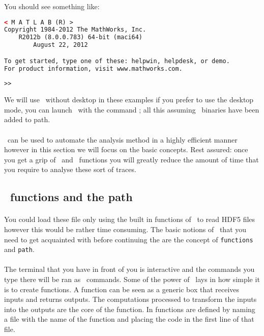 You should see something like:
\begin{lstlisting}[numbers=none,language=xml]
		< M A T L A B (R) >
Copyright 1984-2012 The MathWorks, Inc.
	R2012b (8.0.0.783) 64-bit (maci64)
		August 22, 2012

To get started, type one of these: helpwin, helpdesk, or demo.
For product information, visit www.mathworks.com.
 
>> 
\end{lstlisting}

We will use \matlab\ without desktop in these examples if you prefer to use the desktop mode, you can launch \matlab\ with the command ; all this assuming \matlab\ binaries have been added to path.

\paragraph{}
\matlab\ can be used to automate the analysis method in a highly efficient manner however in this section we will focus on the basic concepts. Rest assured: once you get a grip of \matlab\ and \matlab\ functions you will greatly reduce the amount of time that you require to analyse these sort of traces.

\subsection{\matlab\ functions and the path}
\paragraph{}
You could load these file only using the built in functions of \matlab\ to read HDF5 files however this would be rather time consuming. The basic notions of \matlab\ that you need to get acquainted with before continuing the are the concept of \texttt{functions} and \texttt{path}.
\paragraph{}
The terminal that you have in front of you is interactive and the commands you type there will be ran as \matlab\ commands. Some of the power of \matlab\ lays in how simple it is to create functions. A function can be seen as a generic box that receives inputs and returns outputs. The computations processed to transform the inputs into the outputs are the core of the function. In \matlab functions are defined by naming a file with the name of the function and placing the code  in the first line of that file.

